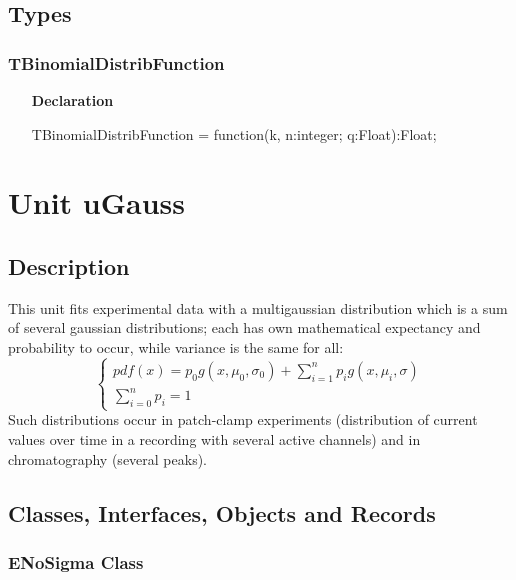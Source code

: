 \documentclass[12pt,a4paper,oneside]{report}
\newcommand{\lmath}[1]{   %
	\marginpar{\vspace{#1} 
		\begin{flushright}
			LMath
	\end{flushright} }
}
\newcommand{\declarationitem}[1]{\textbf{#1}}
\begin{document}
\subsection{Types}
\subsubsection{TBinomialDistribFunction}
\label{udistribs-TBinomialDistribFunction}
\begin{itemize}\item[\declarationitem{Declaration}\hfill]
	\begin{flushleft}
		\begin{ttfamily}
			TBinomialDistribFunction = function(k, n:integer; q:Float):Float;\end{ttfamily}
		
	\end{flushleft}
	
\end{itemize}



\section{Unit uGauss}\lmath{-24pt}
\label{ugauss}
\subsection{Description}
This unit fits experimental data with a multigaussian distribution which is a sum of several gaussian distributions; each has own mathematical expectancy and probability to occur, while variance is the same for all:
\begin{equation}
\label{eq:sum_gaussians}
\begin{cases}
pdf(x)=p_0g(x,\mu_0,\sigma_0)+\sum\limits_{i=1}^{n}p_{i}g(x,\mu_i,\sigma) \\
\sum\limits_{i=0}^{n}p_i=1 \,
\end{cases}
\end{equation}
Such distributions occur in patch{-}clamp experiments (distribution of current values over time in a recording with several active channels) and in chromatography (several peaks).
\subsection{Classes, Interfaces, Objects and Records}
\subsubsection{ENoSigma Class}
\label{ugauss.ENoSigma}
\end{document}
